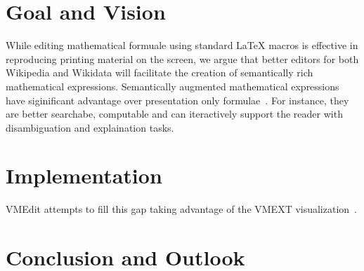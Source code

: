 \documentclass{llncs}
\begin{document}
\section{Goal and Vision}
While editing mathematical formuale using standard \LaTeX{} macros is effective in reproducing printing material on the screen, we argue that better editors for both Wikipedia and Wikidata will facilitate the creation of semantically rich mathematical expressions.
Semantically augmented mathematical expressions have siginificant advantage over presentation only formulae~\cite{dis}.
For instance, they are better searchabe, computable and can iteractively support the reader with disambiguation and explaination tasks.
\section{Implementation}
VMEdit attempts to fill this gap taking advantage of the VMEXT visualization~\cite{vmext17}.
\section{Conclusion and Outlook}
\printbibliography
\end{document}
